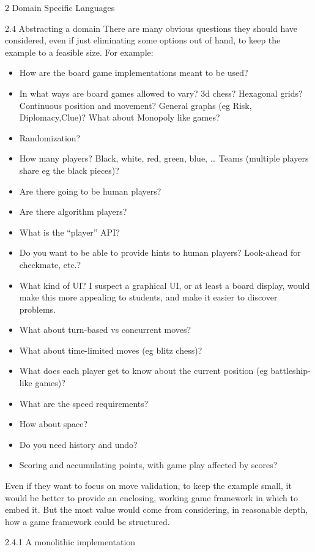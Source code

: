 \documentclass[12pt]{PalisadesLakesBook}
\begin{document}
\begin{plSection}{}
\begin{plSection}{2 Domain Specific Languages}
\begin{plSection}{2.4 Abstracting a domain}
There are many obvious questions they should have considered,
even if just eliminating some options out of hand,
to keep the example to a feasible size.
For example:
\begin{itemize}
  \item How are the board game implementations meant to be used?
  \item In what ways are board games allowed to vary?
  3d chess? Hexagonal grids? Continuous position and movement?
  General graphs (eg Risk, Diplomacy,Clue)? 
  What about Monopoly like games?
  \item Randomization?
  \item How many players? 
  Black, white, red, green, blue, {\ldots}
  Teams (multiple players share eg the black pieces)?
  \item Are there going to be human players? 
  \item Are there algorithm players?
  \item What is the ``player'' API?
  \item Do you want to be able to provide hints to human players?
  Look-ahead for checkmate, etc.?
  \item What kind of UI?
  I suspect a graphical UI, or at least a board display,
  would make this more appealing to students, and make it easier
  to discover problems.
  \item What about turn-based vs concurrent moves?
  \item What about time-limited moves (eg blitz chess)?
  \item What does each player get to know about the current 
  position (eg battleship-like games)?
  \item What are the speed requirements?
  \item How about space? 
  \item Do you need history and undo?
  \item Scoring and accumulating points, with game play
  affected by scores? 
\end{itemize}

Even if they want to focus on move validation,
to keep the example small, it would be better to provide
an enclosing, working game framework in which to embed it.
But the most value would come from considering,
in reasonable depth,
how a game framework could be structured.

\begin{plSection}{2.4.1 A monolithic implementation}


\end{plSection}
\end{plSection}
\end{plSection}
\end{plSection}
\end{document}
